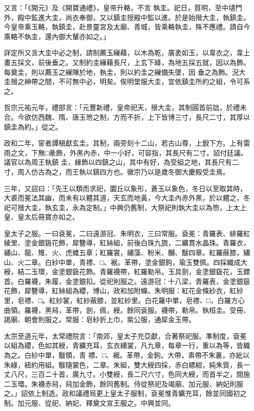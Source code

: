 \begin{pinyinscope}
 又言：「《開元》及《開寶通禮》，皇帝升輅，不言
 執圭。祀日，質明，至中壝門外，殿中監進大圭，尚衣奉御，又以鎮圭授殿中監以進。於是始搢大圭，執鎮圭。今皇帝乘玉輅，執鎮圭，赴景靈宮及太廟、青城，皆乘輅執圭，殊不應禮。請自今乘輅不執圭，還內御大輦亦如之。」



 詳定所又言大圭中必之制，請制薦玉繅藉，以木為乾，廣袤如玉，以韋衣之，韋上畫五採文，前後垂之。又制約圭繅藉長尺，上玄下絳，為地五採五就，因以為飾。每奠圭，則以薦玉之繅陳於地，執圭，則以約圭之繅備失墜，因
 垂之為飾。況大圭搢之紳帶之間，不可無中必，明矣。俟明堂服大圭，宜依鎮圭所約之組，令可系之。



 哲宗元祐元年，禮部言：「元豐新禮，皇帝祀天，搢大圭，其制圓首前詘，於禮未合。今欲仿西魏、隋、唐玉笏之制，方而不折，上下皆博三寸，長尺二寸，其厚以鎮圭為約。」從之。



 政和二年，宦者譚稹獻玄圭。其制，兩旁刻十二山，若古山尊，上銳下方。上有雷雨之文，下無□彖飾，外黑內赤，中一小好，可容指，其長尺有二寸。詔付廷議。議官以為周王執鎮
 圭，緣飾以四鎮之山，其中有好，為受組之地，其長尺有二寸，周人仿古為之，而王執以鎮四方也。徽宗乃以是歲冬御大慶殿受圭焉。



 三年，又詔曰：「先王以類而求祀，圜丘以象形，蒼玉以象色，冬日以至取其時，大裘而冕法其幽，而未有以體其道，天玄而地黃，今大圭內赤外黑，於以體之，冬祀可搢大圭，執玄圭，永為定制。」中興仍舊制，大祭祀則執大圭以為笏，上太上皇、皇太后冊寶亦如之。



 皇太子之服。一曰袞冕，二曰遠游冠、朱明衣，三曰常服。袞冕：青羅表、緋羅紅綾里、塗金銀鈒花飾，犀簪導，紅絲組，前後白珠九旒，二纊貫水晶珠。青羅衣，繡山、龍、雉、火、虎蜼五章；紅羅裳，繡藻、粉米、黼、黻四章。紅羅蔽膝，繡山、火二章。白紗中單，青褾、□、裾。革帶，塗金銀鉤，瑜玉雙佩。四採織成大綬，結二玉環，金塗銀鈒花飾。青羅襪帶，紅羅勒帛。玉具劍，金塗銀鈒花，玉鏢首。白羅襪，朱履，金塗銀扣。從祀則服之。遠游冠：十八梁，青羅表，金塗銀鈒
 花飾，犀簪導，紅絲組為纓，博山，政和加附蟬。朱明服：紅花金條紗衣，紅紗里，皂褾、□。紅紗裳，紅紗蔽膝，並紅紗里。白花羅中單，皂褾、□，白羅方心曲領。羅襪，黑舄，革帶，劍，佩，綬。餘同袞服。襪帶，勒帛。執桓圭。受冊、謁廟、朝會則服之。常服：皂紗折上巾，紫公服，通犀金玉帶。



 太宗至道元年，太常禮院言：「南郊，皇太子充亞獻，合著祭祀服。準制度，袞冕以組為纓，色如其綬，青纊充耳，玄衣纁裳，凡九章，每章一行，重以為等，皆織為之。白紗中單，黻領，青
 褾、□、裾。革帶，金鉤。大帶，素帶不朱裏，亦紕以朱綠，紐約用組。黻隨裳色，二章。朱組，雙大綬四採，赤白縹紺，純朱質，長一丈八尺，三百二十首，廣九寸。小雙綬，長二尺六寸，色同大綬，而首半之，間施二玉環。朱襪赤舄，舄加金飾，餘同舊制。侍從祭祀及竭廟、加元服、納妃則服之。」詔依上制造。政和議禮局更上皇太子服制，袞冕惟青纊充耳，餘並同國初之制。加元服、從祀、納妃、釋奠文宣王服之。中興並同。




\end{pinyinscope}

